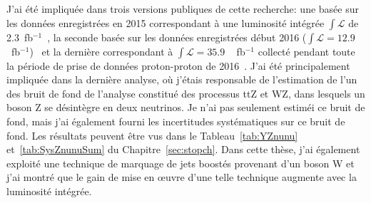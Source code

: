 J'ai été impliquée dans trois versions publiques de cette recherche: une basée sur les données enregistrées en 2015 correspondant à une luminosité intégrée $\int{\mathcal{L}} $ de 2.3~fb$^{-1}$~\cite{Sirunyan:2016jpr}, la seconde basée sur les données enregistrées début 2016 ($\int{\mathcal {L}} = 12.9 $~fb$^{-1} $)~\cite{CMS:2016vew} et la dernière correspondant à $ \int{\mathcal {L}} = 35.9 $ ~ fb$^{-1} $ collecté pendant toute la période de prise de données proton-proton de 2016~\cite{Sirunyan:2017xse}. J'ai été principalement impliquée dans la dernière analyse, où j'étais responsable de l'estimation de l'un des bruit de fond de l'analyse constitué des processus ttZ et WZ, dans lesquels un boson Z se désintègre en deux neutrinos. Je n’ai pas seulement estiméi ce bruit de fond, mais j’ai également fourni les incertitudes systématiques sur ce bruit de fond. Les résultats peuvent être vus dans le Tableau~\ref{tab:YZnunu} et~\ref{tab:SysZnunuSum} du Chapitre~\ref{sec:stopch}. Dans cette thèse, j'ai également exploité une technique de marquage de jets boostés provenant d'un boson W et j'ai montré que le gain de mise en œuvre d'une telle technique augmente avec la luminosité intégrée.


